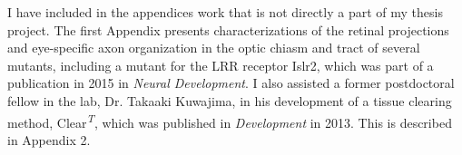 I have included in the appendices work that is not directly a part of my thesis project.
The first Appendix presents characterizations of the retinal projections and eye-specific axon organization in the optic chiasm and tract of several mutants, including a mutant for the LRR receptor Islr2, which was part of a publication in 2015 in \emph{Neural Development}.
I also assisted a former postdoctoral fellow in the lab, Dr. Takaaki Kuwajima, in his development of a tissue clearing method, Clear\textsuperscript{\emph{T}}, which was published in \emph{Development} in 2013.
This is described in Appendix 2.
